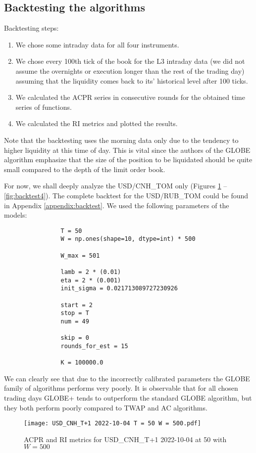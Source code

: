     \subsection{Backtesting the algorithms}\label{section:backtest}
        Backtesting steps:
        \begin{enumerate}
            \item We chose some intraday data for all four instruments.
            \item We chose every 100th tick of the book for the L3 intraday data (we did not assume the overnights or execution longer than the rest of the trading day) assuming that the liquidity comes back to its' historical level after 100 ticks.
            \item We calculated the ACPR series in consecutive rounds for the obtained time series of functions.
            \item We calculated the RI metrics and plotted the results.
        \end{enumerate}
        Note that the backtesting uses the morning data only due to the tendency to higher liquidity at this time of day. 
        This is vital since the authors of the GLOBE algorithm emphasize that the size of the position to be liquidated should be quite small compared to the depth of the limit order book.

        For now, we shall deeply analyze the USD/CNH\_TOM only (Figures \ref{fig:backtest1} -- \ref{fig:backtest4}). The complete backtest for the USD/RUB\_TOM could be found in Appendix \ref{appendix:backtest}.
        We used the following parameters of the models:
            \begin{verbatim}
                T = 50
                W = np.ones(shape=10, dtype=int) * 500
    
                W_max = 501
    
                lamb = 2 * (0.01)
                eta = 2 * (0.001)
                init_sigma = 0.021713089727230926
    
                start = 2
                stop = T
                num = 49
    
                skip = 0
                rounds_for_est = 15
    
                K = 100000.0
            \end{verbatim}

        We can clearly see that due to the incorrectly calibrated parameters the GLOBE family of algorithms performs very poorly. 
        It is observable that for all chosen trading days GLOBE+ tends to outperform the standard GLOBE algorithm, but they both perform poorly compared to TWAP and AC algorithms.
        \begin{figure}[htbp]
            \texttt{[image: USD\_CNH\_T+1 2022-10-04 T = 50 W = 500.pdf]}
            \caption{ACPR and RI metrics for USD\_CNH\_T+1 2022-10-04 at 50 with $W = 500$}\label{fig:backtest1}
        \end{figure}
        
